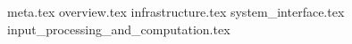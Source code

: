 {meta.tex}
{overview.tex}
{infrastructure.tex}
{system_interface.tex}
{input_processing_and_computation.tex}
